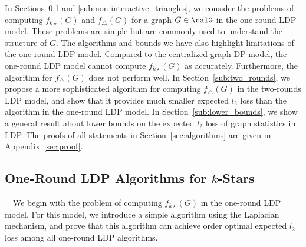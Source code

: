 In 
Sections~\ref{sub:non-interactive_k_stars} and \ref{sub:non-interactive_triangles}, 
we consider the problems of computing $f_{k\star}(G)$ 
and $f_\triangle(G)$ 
for a graph $G \in \calG$ in the 
one-round 
LDP model. 
These problems are simple but are commonly used to understand the structure of $G$. 
The algorithms and bounds we have also highlight limitations of the
one-round 
LDP model. Compared to the centralized graph DP model, the
one-round 
LDP model cannot compute $f_{k\star}(G)$ as accurately.
Furthermore, the algorithm for $f_\triangle(G)$ does not perform 
well. 
In Section~\ref{sub:two_rounds}, we propose a more sophisticated algorithm for computing  $f_\triangle(G)$ in the two-rounds LDP model, and show that it provides much smaller expected $l_2$ loss than the algorithm in the one-round LDP model.
In Section~\ref{sub:lower_bounds}, we show a general result about lower bounds on the expected $l_2$ loss of graph statistics in LDP. 
The proofs of all statements in Section~\ref{sec:algorithms} are given in Appendix~\ref{sec:proof}.

\subsection{One-Round LDP Algorithms for $k$-Stars}
\label{sub:non-interactive_k_stars}

~~We begin with the problem of computing $f_{k\star}(G)$ in the 
one-round 
LDP model. 
For this model, we introduce a simple algorithm using the Laplacian mechanism, and prove that this algorithm can achieve order optimal expected $l_2$ loss among all one-round LDP algorithms. 


